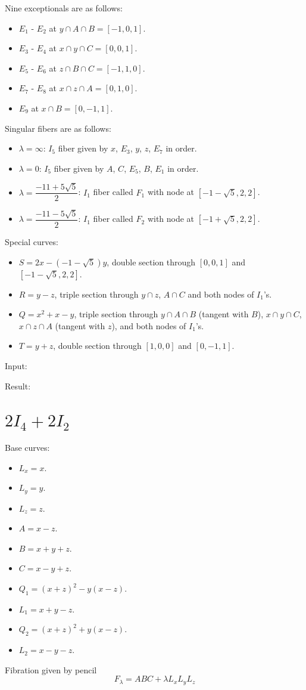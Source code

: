 \documentclass{article}
\begin{document}
Nine exceptionals are as follows:
\begin{itemize}
  \item $E_1$ - $E_2$ at $y \cap A \cap B = [-1,0,1]$.
  \item $E_3$ - $E_4$ at $x \cap y \cap C = [0,0,1]$.
  \item $E_5$ - $E_6$ at $z \cap B \cap C = [-1,1,0]$.
  \item $E_7$ - $E_8$ at $x \cap z \cap A = [0,1,0]$.
  \item $E_9$ at $x \cap B = [0,-1,1]$.
\end{itemize}
Singular fibers are as follows:
\begin{itemize}
  \item $\lambda = \infty$: $I_5$ fiber given by $x$, $E_3$, $y$, $z$, $E_7$ in order.
  \item $\lambda = 0$: $I_5$ fiber given by $A$, $C$, $E_5$, $B$, $E_1$ in order.
  \item $\lambda = \dfrac{-11 + 5\sqrt{5}}{2}$: $I_1$ fiber called $F_1$ with node at $[-1-\sqrt{5},2,2]$.
  \item $\lambda = \dfrac{-11 - 5\sqrt{5}}{2}$: $I_1$ fiber called $F_2$ with node at $[-1+\sqrt{5},2,2]$.
\end{itemize}
Special curves:
\begin{itemize}
  \item $S = 2x - (-1 -\sqrt{5})y$, double section through $[0,0,1]$ and $[-1-\sqrt{5},2,2]$.
  \item $R = y - z$, triple section through $y \cap z$, $A \cap C$ and both nodes of $I_1$'s.
  \item $Q = x^2 + x - y$, triple section through $y \cap A \cap B$ (tangent with $B$), $x \cap y \cap C$, $x \cap z \cap A$ (tangent with $z$), and both nodes of $I_1$'s.
  \item $T = y + z$, double section through $[1,0,0]$ and $[0,-1,1]$.
\end{itemize}

Input:

Result:





\section{$2I_4 + 2I_2$}


Base curves:
\begin{itemize}
  \item $L_x = x$.
  \item $L_y = y$.
  \item $L_z = z$.
  \item $A = x - z$.
  \item $B = x + y + z$.
  \item $C = x - y + z$.
  \item $Q_1 = (x+z)^2 - y(x-z)$.
  \item $L_1 = x + y - z$.
  \item $Q_2 = (x+z)^2 + y(x-z)$.
  \item $L_2 = x - y - z$.
\end{itemize}
Fibration given by pencil
\[F_\lambda = ABC + \lambda L_xL_yL_z\]
\end{document}
